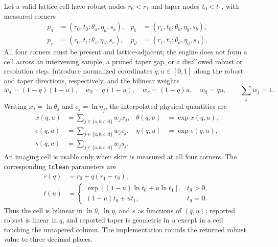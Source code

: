 \documentclass[11pt]{article}
\begin{document}
Let a valid lattice cell have robust nodes $r_0<r_1$ and taper nodes
$t_0<t_1$, with measured corners
\begin{align*}
 p_a&=(r_0,t_0;\theta_a,\eta_a,s_a),&
 p_b&=(r_1,t_0;\theta_b,\eta_b,s_b),\\
 p_c&=(r_0,t_1;\theta_c,\eta_c,s_c),&
 p_d&=(r_1,t_1;\theta_d,\eta_d,s_d).
\end{align*}
All four corners must be present and lattice-adjacent; the engine does not
form a cell across an intervening sample, a pruned taper gap, or a disallowed
robust or resolution step.  Introduce normalized coordinates
$q,u\in[0,1]$ along the robust and taper directions, respectively, and the
bilinear weights
\begin{equation}
 w_a=(1-q)(1-u),\quad w_b=q(1-u),\quad
 w_c=(1-q)u,\quad w_d=qu,
 \qquad \sum_j w_j=1.
 \label{eq:cell-weights}
\end{equation}
Writing $x_j=\ln\theta_j$ and $e_j=\ln\eta_j$, the interpolated physical
quantities are
\begin{align}
 x(q,u)&=\sum_{j\in\{a,b,c,d\}}w_jx_j,&
 \theta(q,u)&=\exp x(q,u),\label{eq:cell-theta}\\
 e(q,u)&=\sum_{j\in\{a,b,c,d\}}w_je_j,&
 \eta(q,u)&=\exp e(q,u),\label{eq:cell-eta}\\
 s(q,u)&=\sum_{j\in\{a,b,c,d\}}w_js_j.&&
 \label{eq:cell-skirt}
\end{align}
An imaging cell is usable only when skirt is measured at all four corners.
The corresponding \texttt{tclean} parameters are
\begin{align}
 r(q)&=r_0+q(r_1-r_0),\label{eq:cell-robust}\\
 t(u)&=
 \begin{cases}
  \exp[(1-u)\ln t_0+u\ln t_1],&t_0>0,\\
  (1-u)t_0+ut_1,&t_0=0.
 \end{cases}
 \label{eq:cell-taper}
\end{align}
Thus the cell is bilinear in $\ln\theta$, $\ln\eta$, and $s$ as functions of
$(q,u)$; reported robust is linear in $q$, and reported taper is geometric in
$u$ except in a cell touching the untapered column.  The implementation rounds
the returned robust value to three decimal places.
\end{document}
